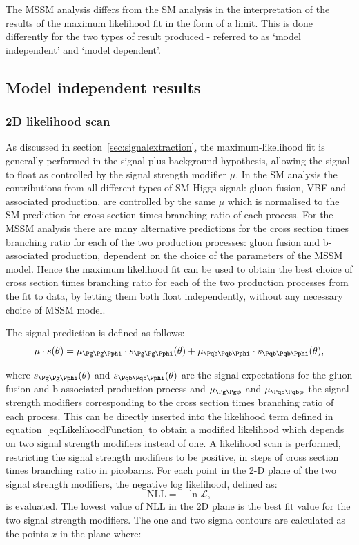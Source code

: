The \ac{MSSM} analysis differs from the \ac{SM} analysis in the
interpretation of the results of the maximum likelihood fit in the form of a limit. This
is done differently for the two types of result produced - referred to as `model 
independent' and `model dependent'. 

\subsection{Model independent results}
\label{sec:modelindependent}

\subsubsection{2D likelihood scan}

As discussed in section~\ref{sec:signalextraction}, the maximum-likelihood fit
is generally performed in the signal plus background hypothesis, allowing the
signal to float as controlled by the signal strength modifier $\mu$. In the
\ac{SM} analysis the contributions from all different types of \ac{SM} Higgs
signal: gluon fusion, \ac{VBF} and associated production, are controlled by the
same $\mu$ which is normalised to the \ac{SM} prediction for cross section times
branching ratio of each process. For the \ac{MSSM}
analysis there are many alternative predictions for the cross section times
branching ratio for each of the two production processes: gluon fusion and
b-associated production, dependent on the choice of the parameters of the
\ac{MSSM} model. Hence the maximum likelihood fit can be used to obtain the best
choice of cross section times branching ratio for each of the two production
processes from the fit to data, by letting them both float independently,
without any necessary choice of \ac{MSSM} model.

The signal prediction is defined as follows:
\begin{equation}
\mu \cdot s(\theta) = \mu_{\Pg\Pg\Pphi} \cdot s_{\Pg\Pg\Pphi}(\theta) + \mu_{\Pqb\Pqb\Pphi}
\cdot s_{\Pqb\Pqb\Pphi}(\theta) ,
\end{equation}

where $s_{\Pg\Pg\Pphi}(\theta)$ and $s_{\Pqb\Pqb\Pphi}(\theta)$ are the signal expectations for the gluon
fusion and b-associated production process and $\mu_{\Pg\Pg\phi}$ and
$\mu_{\Pqb\Pqb\phi}$
the signal strength modifiers corresponding to the cross section times branching
ratio of each process. This can be directly inserted into the likelihood
term defined in equation~\ref{eq:LikelihoodFunction} to obtain a modified
likelihood which depends on two signal strength modifiers instead of one. A
likelihood scan is performed, restricting the signal strength modifiers to
be positive, in steps of cross section times branching ratio in picobarns. For
each point in the 2-D plane of the two signal strength modifiers, the negative
log likelihood, defined as:
\begin{equation}
\mathrm{NLL} = - \ln \mathcal{L} ,  
\end{equation}
is evaluated. The lowest value of $\mathrm{NLL}$ in the 2D plane is the best fit value
for the two signal strength modifiers. The one and two sigma contours are
calculated as the points $x$ in the plane where:

